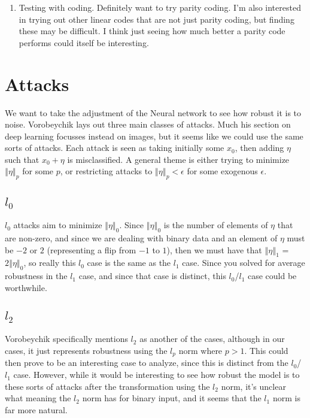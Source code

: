 \documentclass{article}
\newcommand{\e}{\epsilon}
\newcommand{\norm}[1]{\left\Vert #1 \right\Vert}
\begin{document}
\begin{enumerate}
\item Testing with coding. Definitely want to try parity coding. I'm also interested in trying out other linear codes that are not just parity coding, but finding these may be difficult. I think just seeing how much better a parity code performs could itself be interesting.

\end{enumerate}

\section{Attacks}

We want to take the adjustment of the Neural network to see how robust it is to noise. Vorobeychik lays out three main classes of attacks. Much his section on deep learning focusses instead on images, but it seems like we could use the same sorts of attacks. Each attack is seen as taking initially some $x_0$, then adding $\eta$ such that $x_0 + \eta$ is misclassified. A general theme is either trying to minimize $\norm{\eta}_p$ for some $p$, or restricting attacks to $\norm{\eta}_p < \e$ for some exogenous $\e$.

\subsection{$l_0$}

$l_0$ attacks aim to minimize $\norm{\eta}_0$. Since $\norm{\eta}_0$ is the number of elements of $\eta$ that are non-zero, and since we are dealing with binary data and an element of $\eta$ must be $-2$ or $2$ (representing a flip from $-1$ to $1$), then we must have that $\norm{\eta}_1$ = $2\norm{\eta}_0$, so really this $l_0$ case is the same as the $l_1$ case. Since you solved for average robustness in the $l_1$ case, and since that case is distinct, this $l_0$/$l_1$ case could be worthwhile.

\subsection{$l_2$}

Vorobeychik specifically mentions $l_2$ as another of the cases, although in our cases, it just represents robustness using the $l_p$ norm where $p > 1$. This could then prove to be an interesting case to analyze, since this is distinct from the $l_0$/$l_1$ case. However, while it would be interesting to see how robust the model is to these sorts of attacks after the transformation using the $l_2$ norm, it's unclear what meaning the $l_2$ norm has for binary input, and it seems that the $l_1$ norm is far more natural.
\end{document}

